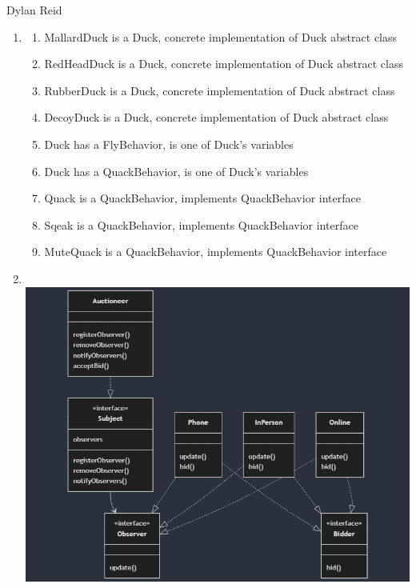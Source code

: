 \documentclass{article}
\begin{document}
Dylan Reid
\begin{enumerate}
    \addtocounter{enumi}{1}
    \item \begin{enumerate}
    \renewcommand{\labelenumii}{(\arabic{enumii})}
        \item MallardDuck is a Duck, concrete implementation of Duck abstract class
        \item RedHeadDuck is a Duck, concrete implementation of Duck abstract class
        \item RubberDuck is a Duck, concrete implementation of Duck abstract class
        \item DecoyDuck is a Duck, concrete implementation of Duck abstract class
        \item Duck has a FlyBehavior, is one of Duck's variables
        \item Duck has a QuackBehavior, is one of Duck's variables
        \item Quack is a QuackBehavior, implements QuackBehavior interface
        \item Sqeak is a QuackBehavior, implements QuackBehavior interface
        \item MuteQuack is a QuackBehavior, implements QuackBehavior interface
    \end{enumerate}
    \item $ $\\\includegraphics[width=1\textwidth]{P3UML.png}
\end{enumerate}  
\end{document}
